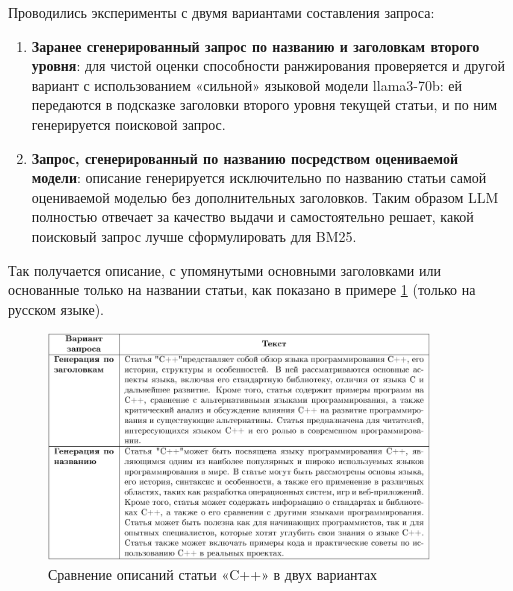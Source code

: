 \documentclass{article}
\theoremstyle{definition}
\theoremstyle{plain}
\begin{document}
Проводились эксперименты с двумя вариантами составления запроса:
\begin{enumerate}

    \item \textbf{Заранее сгенерированный запрос по названию и заголовкам второго уровня}: для чистой оценки способности ранжирования проверяется и другой вариант с использованием «сильной» языковой модели llama3-70b: 
    ей передаются в подсказке заголовки второго уровня текущей статьи, и по ним генерируется поисковой запрос.  
    
    \item \textbf{Запрос, сгенерированный по названию посредством оцениваемой модели}: описание генерируется исключительно по названию статьи самой оцениваемой моделью без дополнительных заголовков.
    Таким образом LLM полностью отвечает за качество выдачи и самостоятельно решает, какой поисковый запрос лучше сформулировать для BM25.

\end{enumerate}
Так получается описание, с упомянутыми основными заголовками или основанные только на названии статьи, как показано в примере \ref{fig:c++} (только на русском языке).

\begin{figure}[ht!]
  \centering
  \includegraphics[width=0.9\textwidth]{figures/two_queries.png}
  \caption{Сравнение описаний статьи «C++» в двух вариантах}
  \label{fig:c++}
\end{figure}
\end{document}
